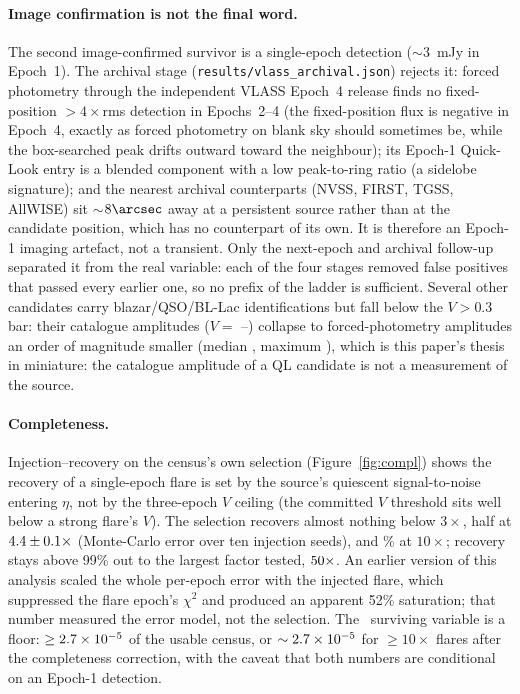 \documentclass[twocolumn]{aastex631}
\newcommand{\code}[1]{\texttt{#1}}
\begin{document}
\paragraph{Image confirmation is not the final word.} The second image-confirmed survivor is a
single-epoch detection ($\sim$3~mJy in Epoch~1). The archival stage
(\code{results/vlass\_archival.json}) rejects it: forced photometry through the independent
VLASS Epoch~4 release finds no fixed-position $>4\times$rms detection in Epochs~2--4 (the
fixed-position flux is negative in Epoch~4, exactly as forced photometry on blank sky should
sometimes be, while the box-searched peak drifts outward toward the neighbour); its Epoch-1
Quick-Look entry is a blended component with a low peak-to-ring ratio (a sidelobe signature); and
the nearest archival counterparts (NVSS, FIRST, TGSS, AllWISE) sit $\sim$$8\arcsec$ away at a
persistent source rather than at the candidate position, which has no counterpart of its own. It is
therefore an Epoch-1 imaging artefact, not a transient. Only the next-epoch and archival follow-up
separated it from the real variable: each of the four stages removed false positives that passed
every earlier one, so no prefix of the ladder is sufficient. Several other candidates carry
blazar/QSO/BL-Lac identifications but fall below the $V>0.3$ bar: their catalogue amplitudes
($V=$ \vlassRealCandVmin--\vlassRealCandVmax) collapse to forced-photometry amplitudes an order of
magnitude smaller (median \vlassRealForcedVmed, maximum \vlassRealForcedVmax), which is this
paper's thesis in miniature: the catalogue amplitude of a QL candidate is not a measurement of the
source.

\paragraph{Completeness.} Injection--recovery on the census's own selection
(Figure~\ref{fig:compl}) shows the recovery of a single-epoch flare is set by the source's
quiescent signal-to-noise entering $\eta$, not by the three-epoch $V$ ceiling (the committed $V$
threshold sits well below a strong flare's $V$). The selection recovers almost nothing below
$3\times$, half at $4.4\pm0.1\times$ (Monte-Carlo error over
ten injection seeds), and \vlassRealComplTen\% at $10\times$; recovery stays above 99\% out to the
largest factor tested, $50\times$. An earlier version of this analysis scaled the whole per-epoch error with the injected
flare, which suppressed the flare epoch's $\chi^2$ and produced an apparent 52\% saturation; that
number measured the error model, not the selection. The \vlassRealNarchival\ surviving variable is
a floor: $\ge2.7\times10^{-5}$ of the usable census, or $\sim2.7\times10^{-5}$ for
$\ge$$10\times$ flares after the completeness correction, with the caveat that both numbers are
conditional on an Epoch-1 detection.
\end{document}
